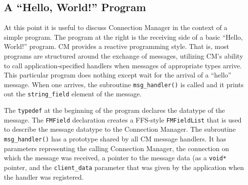 \documentclass[11pt]{article}
\begin{document}
\subsection{A ``Hello, World!'' Program\label{hello}}
At this point it is useful to discuss Connection Manager in the context of a
simple program.  The program at the right is the receiving side of a basic
``Hello, World!'' program.  CM provides a
reactive programming style.  That is, most programs are structured around
the exchange of messages, utilizing CM's ability to call
application-specified handlers when messages of appropriate types arrive.
This particular program does nothing except wait for the arrival of a
``hello'' message.  When one arrives, the subroutine \verb+msg_handler()+ is
called and it prints out the \verb+string_field+ element of the message.

The \verb+typedef+ at the beginning of the program declares the datatype of
the message.  The \verb+FMField+ declaration creates a FFS-style
\verb+FMFieldList+ that is used to describe the message datatype to the
Connection Manager.  The subroutine \verb+msg_handler()+ has a prototype
shared by all CM message handlers.  It has parameters representing the
calling Connection Manager, the connection on which the message was
received, a pointer to the message data (as a \verb+void*+ pointer, and
the \verb+client_data+ parameter that was given by the application when the
handler was registered.
\end{document}
